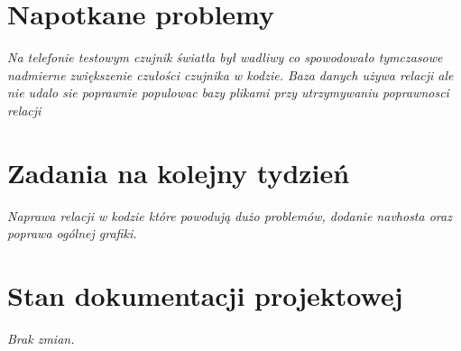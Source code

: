 \documentclass[12pt,a4paper]{mwart}
\begin{document}
\section{Napotkane problemy}

\textit{Na telefonie testowym czujnik światła był wadliwy co spowodowało tymczasowe nadmierne zwiększenie czułości czujnika w kodzie. Baza danych używa relacji
ale nie udalo sie poprawnie populowac bazy plikami przy utrzymywaniu poprawnosci relacji} %

\section{Zadania na kolejny tydzień}

\textit{Naprawa relacji w kodzie które powodują dużo problemów, dodanie navhosta oraz poprawa ogólnej grafiki.} %

\section{Stan dokumentacji projektowej}

\textit{Brak zmian.} %
\end{document}
